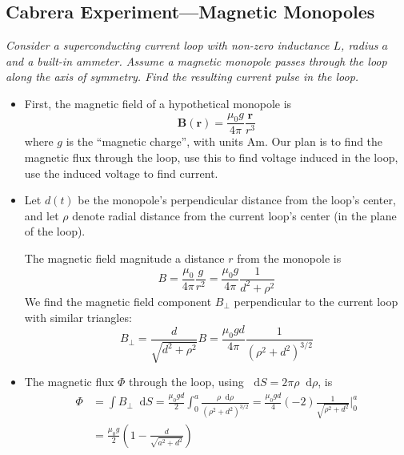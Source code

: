 \documentclass[11pt, a4paper]{article}
\newcommand{\diff}{\mathop{}\!\mathrm{d}} %
\renewcommand{\vec}[1]{\bm{#1}} %
\renewcommand{\r}{\vec{r}}
\newcommand{\B}{\vec{B}}  %
\newcommand{\mm}{\mu_{0}}  %
\newcommand{\m}{\vec{m}}  %
\begin{document}
\subsection{Cabrera Experiment---Magnetic Monopoles}
\textit{Consider a superconducting current loop with non-zero inductance $ L$, radius $ a $ and a built-in ammeter. Assume a magnetic monopole passes through the loop along the axis of symmetry. Find the resulting current pulse in the loop.}
\begin{itemize}
	\item First, the magnetic field of a hypothetical monopole is
	\begin{equation*}
		\B(\r) = \frac{\mm g}{4\pi} \frac{\r}{r^{3}}
	\end{equation*}
	where $ g $ is the ``magnetic charge'', with units $ \si{\ampere \meter} $. Our plan is to find the magnetic flux through the loop, use this to find voltage induced in the loop, use the induced voltage to find current.
	
	\item Let $ d(t) $ be the monopole's perpendicular distance from the loop's center, and let $ \rho $ denote radial distance from the current loop's center (in the plane of the loop).
	
	The magnetic field magnitude a distance $ r $ from the monopole is
	\begin{equation*}
		B = \frac{\mm}{4\pi} \frac{g}{r^{2}} = \frac{\mm g}{4\pi}\frac{1}{d^{2} + \rho^{2}}
	\end{equation*}
	We find the magnetic field component $ B_{\perp} $ perpendicular to the current loop with similar triangles:
	\begin{equation*}
		B_{\perp} = \frac{d}{\sqrt{d^{2} + \rho^{2}}} B = \frac{\mm g d}{4\pi}\frac{1}{(\rho^{2} + d^{2})^{3/2}}
	\end{equation*}
	
	\item The magnetic flux $ \Phi $ through the loop, using $  \diff S = 2\pi \rho \diff \rho $, is
	\begin{align*}
		\Phi &= \int B_{\perp} \diff S = \frac{\mm g d}{2} \int_{0}^{a} \frac{\rho \diff \rho}{(\rho^{2} + d^{2})^{3/2}} = \frac{\mm g d}{4}(-2)\frac{1}{\sqrt{\rho^{2} + d^{2}}}\bigg |_{0}^{a}\\
		& = \frac{\mm g}{2}\left(1 - \frac{d}{\sqrt{a^{2} + d^{2}}}\right)
	\end{align*}
	

\end{itemize}
\end{document}
